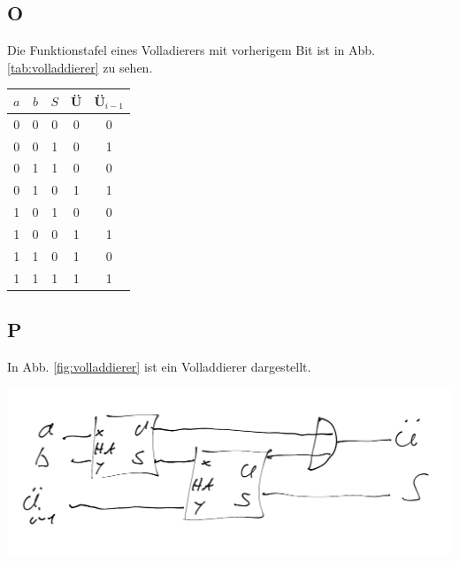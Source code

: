 \documentclass[10pt]{article}
\newenvironment{Figure}
  {\par\medskip\noindent\minipage{\linewidth}}
  {\endminipage\par\medskip}
\begin{document}
\begin{multicols}{2}
	\subsection*{O}
	Die Funktionstafel eines Volladierers mit vorherigem Bit ist in Abb. \ref{tab:volladdierer} zu sehen.
	\begin{center}
		\begin{tabular}{|c|c|c|c|c|}
			\hline
			$a$ & $b$ & $S$ & Ü & Ü$_{i-1}$ \\
			\hline
			0   & 0   & 0   & 0 & 0         \\
			0   & 0   & 1   & 0 & 1         \\
			0   & 1   & 1   & 0 & 0         \\
			0   & 1   & 0   & 1 & 1         \\
			1   & 0   & 1   & 0 & 0         \\
			1   & 0   & 0   & 1 & 1         \\
			1   & 1   & 0   & 1 & 0         \\
			1   & 1   & 1   & 1 & 1         \\
			\hline
		\end{tabular}
		\label{tab:volladdierer}
	\end{center}

	\subsection*{P}
	In Abb. \ref{fig:volladdierer} ist ein Volladdierer dargestellt.
	\begin{Figure}
		\centering
		\includegraphics[width=1\textwidth]{volladdierer.png}
		\label{fig:volladdierer}
	\end{Figure}


\end{multicols}
\end{document}
